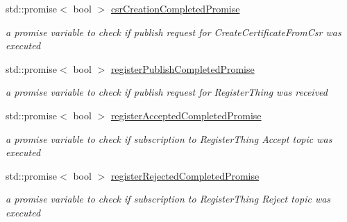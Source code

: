 \begin{DoxyCompactItemize}
\mbox{\label{class_aws_1_1_iot_1_1_device_client_1_1_fleet_provisioning_ac18cad5f3af2baa69431ba0a3f8ae753}} 
std\+::promise$<$ bool $>$ \hyperlink{class_aws_1_1_iot_1_1_device_client_1_1_fleet_provisioning_ac18cad5f3af2baa69431ba0a3f8ae753}{csr\+Creation\+Completed\+Promise}
\begin{DoxyCompactList}\small\item\em a promise variable to check if publish request for Create\+Certificate\+From\+Csr was executed \end{DoxyCompactList}\item 
\mbox{\label{class_aws_1_1_iot_1_1_device_client_1_1_fleet_provisioning_a5f7f726a72c70311d695d859824c07d5}} 
std\+::promise$<$ bool $>$ \hyperlink{class_aws_1_1_iot_1_1_device_client_1_1_fleet_provisioning_a5f7f726a72c70311d695d859824c07d5}{register\+Publish\+Completed\+Promise}
\begin{DoxyCompactList}\small\item\em a promise variable to check if publish request for Register\+Thing was received \end{DoxyCompactList}\item 
\mbox{\label{class_aws_1_1_iot_1_1_device_client_1_1_fleet_provisioning_a02c6207e7109e3b3ab9a65cfb819fac4}} 
std\+::promise$<$ bool $>$ \hyperlink{class_aws_1_1_iot_1_1_device_client_1_1_fleet_provisioning_a02c6207e7109e3b3ab9a65cfb819fac4}{register\+Accepted\+Completed\+Promise}
\begin{DoxyCompactList}\small\item\em a promise variable to check if subscription to Register\+Thing Accept topic was executed \end{DoxyCompactList}\item 
\mbox{\label{class_aws_1_1_iot_1_1_device_client_1_1_fleet_provisioning_ac7e4a4690c0393c21ef3e9d1c83e8d15}} 
std\+::promise$<$ bool $>$ \hyperlink{class_aws_1_1_iot_1_1_device_client_1_1_fleet_provisioning_ac7e4a4690c0393c21ef3e9d1c83e8d15}{register\+Rejected\+Completed\+Promise}
\begin{DoxyCompactList}\small\item\em a promise variable to check if subscription to Register\+Thing Reject topic was executed \end{DoxyCompactList}\item 

\end{DoxyCompactItemize}

